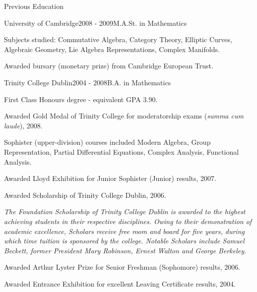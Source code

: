 \documentclass{resume} %
\begin{document}
\begin{rSection}{Previous Education}
\begin{rSubsection}{University of Cambridge}{2008 - 2009}{M.A.St. in Mathematics}{}
\item Subjects studied: Commutative Algebra, Category Theory, Elliptic Curves, Algebraic Geometry, Lie Algebra Representations, Complex Manifolds.
\item Awarded bursary (monetary prize) from Cambridge European Trust.
\end{rSubsection}

\begin{rSubsection}{Trinity College Dublin}{2004 - 2008}{B.A. in Mathematics}{}
\item First Class Honours degree - equivalent GPA 3.90.
\item Awarded Gold Medal of Trinity College for moderatorship exams (\emph{summa cum laude}), 2008.
\item Sophister (upper-division) courses included Modern Algebra, Group Representation, Partial Differential Equations, Complex Analysis, Functional Analysis.
\item Awarded Lloyd Exhibition for Junior Sophister (Junior) results, 2007.
\item Awarded Scholarship of Trinity College Dublin, 2006.

\emph{The Foundation Scholarship of Trinity College Dublin is awarded to the highest achieving students in their respective disciplines. Owing to their demonstration of academic excellence, Scholars receive free room and board for five years, during which time tuition is sponsored by the college. Notable Scholars include Samuel Beckett, former President Mary Robinson, Ernest Walton and George Berkeley.}
\bigskip
\item Awarded Arthur Lyster Prize for Senior Freshman (Sophomore) results, 2006.
\item Awarded Entrance Exhibition for excellent Leaving Certificate results, 2004.
\end{rSubsection}
\end{rSection}

\end{document}
